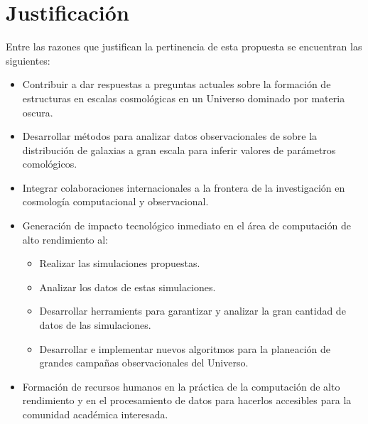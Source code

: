 
\section{Justificaci\'on}

Entre las razones que justifican la pertinencia de esta propuesta se
encuentran las siguientes:

\begin{itemize}
\item Contribuir a dar respuestas a preguntas actuales sobre la
  formaci\'on de estructuras en escalas cosmol\'ogicas en un Universo
  dominado por materia oscura.
\item Desarrollar m\'etodos para analizar datos observacionales de
  sobre la distribuci\'on de galaxias a gran escala para
  inferir valores de par\'ametros comol\'ogicos.
\item Integrar colaboraciones internacionales a la frontera de la
  investigaci\'on en cosmolog\'ia computacional y observacional.
\item Generaci\'on de impacto tecnol\'ogico inmediato en el \'area de
  computaci\'on de alto rendimiento al:
\begin{itemize}
\item Realizar las simulaciones propuestas.
\item Analizar los datos de estas simulaciones.
\item Desarrollar herramients para garantizar y analizar la
  gran cantidad de datos de las simulaciones.
\item Desarrollar e implementar nuevos algoritmos para la planeaci\'on
  de grandes campa\~nas observacionales del Universo.
\end{itemize}
\item Formaci\'on de recursos humanos en la pr\'actica de la
  computaci\'on de alto rendimiento y en el procesamiento de datos
  para hacerlos accesibles para la comunidad acad\'emica interesada. 
\end{itemize}
